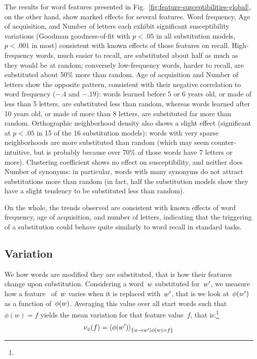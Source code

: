 \begin{new}

The results for word features presented in Fig.~\ref{fig:feature-susceptibilities-global}, on the other hand, show marked effects for several features.
Word frequency, Age of acquisition, and Number of letters each exhibit significant susceptibility variations (Goodman goodness-of-fit with $p < .05$ in all substitution models, $p < .001$ in most) consistent with known effects of those features on recall.
High-frequency words, much easier to recall, are substituted about half as much as they would be at random; conversely low-frequency words, harder to recall, are substituted about 50\% more than random.
Age of acquisition and Number of letters show the opposite pattern, consistent with their negative correlation to word frequency ($-.4$ and $-.19$):
words learned before 5 or 6 years old, or made of less than 5 letters, are substituted less than random, whereas words learned after 10 years old, or made of more than 8 letters, are substituted far more than random.
Orthographic neighborhood density also shows a slight effect (significant at $p < .05$ in 15 of the 16 substitution models):
words with very sparse neighborhoods are more substituted than random (which may seem counter-intuitive, but is probably because over 70\% of those words have 7 letters or more).
Clustering coefficient shows no effect on susceptibility, and neither does Number of synonyms:
in particular, words with many synonyms do not attract substitutions more than random (in fact, half the substitution models show they have a slight tendency to be substituted less than random).

On the whole, the trends observed are consistent with known effects of word frequency, age of acquisition, and number of letters, indicating that the triggering of a substitution could behave quite similarly to word recall in standard tasks.

\end{new}

\subsection{Variation}

We  how words are modified  they are substituted, that is how their features change upon substitution.
Considering a word~$w$ substituted for~$w'$, we measure how a feature~\newtext{$\phi$} of~$w$ varies when it is replaced with~$w'$, that is we look at~$\phi(w')$ as a function of~$\phi(w)$.
Averaging this value over all start words such that $\phi(w) = f$ yields the mean variation for that feature value~$f$, that is:\footnote{
}
$$\nu_{\phi}(f) = \left<\phi(w')\right>_{\left\lbrace w\rightarrow w' | \phi(w) = f \right\rbrace}$$

